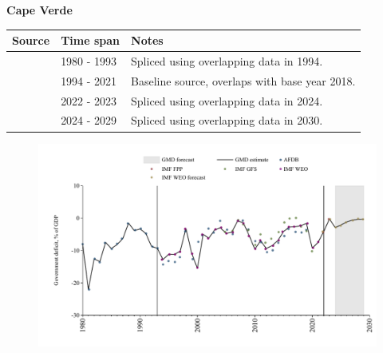 \documentclass[12pt,a4paper,landscape]{article}
\begin{document}
\begin{adjustbox}{max totalsize={\paperwidth}{\paperheight},center}
\begin{minipage}[t][\textheight][t]{\textwidth}
\vspace*{0.5cm}
{}
\begin{center}
{\Large\bfseries Cape Verde}
\end{center}
\vspace{0.5cm}
\begin{table}[H]
\centering
\small
\begin{tabular}{|l|l|l|}
\hline
\textbf{Source} & \textbf{Time span} & \textbf{Notes} \\
\hline
\rowcolor{white}\cite{AFDB}& 1980 - 1993 &Spliced using overlapping data in 1994.\\
\rowcolor{lightgray}\cite{IMF_WEO}& 1994 - 2021 &Baseline source, overlaps with base year 2018.\\
\rowcolor{white}\cite{IMF_FPP}& 2022 - 2023 &Spliced using overlapping data in 2024.\\
\rowcolor{lightgray}\cite{IMF_WEO_forecast}& 2024 - 2029 &Spliced using overlapping data in 2030.\\
\hline
\end{tabular}
\end{table}
\begin{figure}[H]
\centering
\includegraphics[width=\textwidth,height=0.6\textheight,keepaspectratio]{graphs/CPV_govdef_GDP.pdf}
\end{figure}
\end{minipage}
\end{adjustbox}
\end{document}
